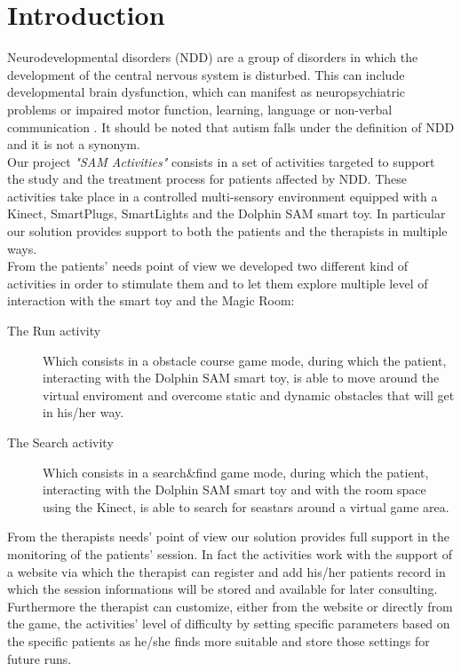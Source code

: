 
	\chapter{Introduction}
	
Neurodevelopmental disorders (NDD) are a group of disorders in which the development of the central nervous system is disturbed. This can include developmental brain dysfunction, which can manifest as neuropsychiatric problems or impaired motor function, learning, language or non-verbal communication \cite{Nature}.
It should be noted that autism falls under the definition of NDD and it is not a synonym.\\


\noindent Our project \textit{"SAM Activities"} consists in a set of activities targeted to support the study and the treatment process for patients affected by NDD. These activities take place in a controlled multi-sensory environment 
equipped with a Kinect, SmartPlugs, SmartLights and the Dolphin SAM smart toy.
In particular our solution provides support to both the patients and the therapists in multiple ways.\\


\noindent From the patients’ needs point of view we developed two different kind of activities in order to stimulate them and to let them explore multiple level of interaction with the smart toy and the Magic Room:
\begin{description}
	\item [The Run activity] Which consists in a obstacle course game mode, during which the patient, interacting with the Dolphin SAM smart toy, is able to move around the virtual enviroment and overcome static and dynamic obstacles that will get in his/her way.
	\item [The Search activity] Which consists in a search\&find game mode, during which the patient, interacting with the Dolphin SAM smart toy and with the room space using the Kinect, is able to search for seastars around a virtual game area.
\end{description}
From the therapists needs' point of view our solution provides full support in the monitoring of the patients’ session. In fact the activities work with the support of a website via which the therapist can register and add his/her patients record in which the session informations will be stored and available for later consulting. Furthermore the therapist can customize, either from the website or directly from the game, the activities’ level of difficulty by setting specific parameters based on the specific patients as he/she finds more suitable and store those settings for future runs.
	